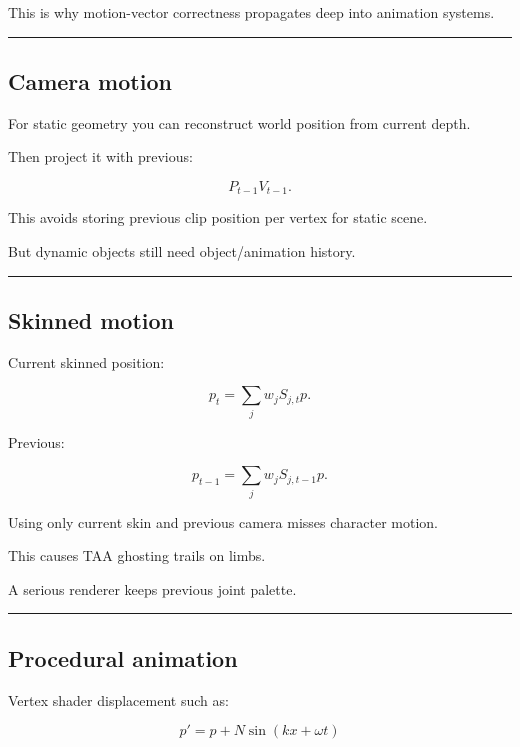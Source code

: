 This is why motion-vector correctness propagates deep into animation systems.

\begin{center}\rule{0.5\linewidth}{0.5pt}\end{center}

\subsection{Camera motion}\label{04-visual-computing-ii-ch040-camera-motion}

For static geometry you can reconstruct world position from current depth.

Then project it with previous:

\[
P_{t-1}V_{t-1}.
\]

This avoids storing previous clip position per vertex for static scene.

But dynamic objects still need object/animation history.

\begin{center}\rule{0.5\linewidth}{0.5pt}\end{center}

\subsection{Skinned motion}\label{04-visual-computing-ii-ch040-skinned-motion}

Current skinned position:

\[
p_t=
\sum_j
w_j
S_{j,t}p.
\]

Previous:

\[
p_{t-1}
=
\sum_j
w_j
S_{j,t-1}p.
\]

Using only current skin and previous camera misses character motion.

This causes TAA ghosting trails on limbs.

A serious renderer keeps previous joint palette.

\begin{center}\rule{0.5\linewidth}{0.5pt}\end{center}

\subsection{Procedural animation}\label{04-visual-computing-ii-ch040-procedural-animation}

Vertex shader displacement such as:

\[
p'=p+
N\sin(
kx+\omega t
)
\]

